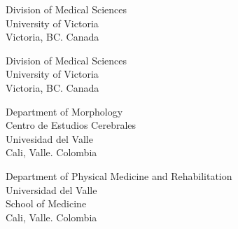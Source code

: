 
{Division of Medical Sciences\\University of Victoria\\Victoria, BC. Canada}

\divider

{Division of Medical Sciences\\University of Victoria\\Victoria, BC. Canada}

\divider

{Department of Morphology\\Centro de Estudios Cerebrales\\Univesidad del Valle\\Cali, Valle. Colombia}

\divider

{Department of Physical Medicine and Rehabilitation\\Universidad del Valle\\School of Medicine\\Cali, Valle. Colombia}
